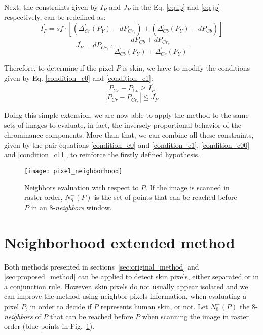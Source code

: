Next, the constraints given by $I_P$ and $J_P$ in the Eq. \ref{eq:ip} and \ref{eq:jp} respectively, can be redefined as:
\begin{equation}
    I^{'}_P = sf \cdot [(\Delta^{'}_{Cr}(P_Y) - dP_{Cr_s}) + (\Delta^{'}_{Cb}(P_Y) - dP_{Cb})]
\end{equation}
\begin{equation}
    J^{'}_P = dP_{Cr_s} \cdot \frac{dP_{Cb} + dP_{Cr_s}} {\Delta^{'}_{Cb}(P_Y) + \Delta^{'}_{Cr}(P_Y)}
\end{equation}

Therefore, to determine if the pixel $P$ is skin, we have to modify the conditions given by Eq. \ref{condition_c0} and \ref{condition_c1}:
\begin{equation}
    P_{Cr} - P_{Cb} \geq I^{'}_P
\label{condition_c00}
\end{equation}
\begin{equation}
   |P_{Cr} - P_{Cr_s}| \leq J^{'}_P
\label{condition_c11}
\end{equation}

Doing this simple extension, we are now able to apply the method to the same sets of images to evaluate, in fact, the inversely proportional behavior of the chrominance components. More than that, we can combine all these constraints, given by the pair equations \ref{condition_c0} and \ref{condition_c1}, \ref{condition_c00} and \ref{condition_c11}, to reinforce the firstly defined hypothesis.


\begin{figure}[H]
    \centering
    \texttt{[image: pixel\_neighborhood]}
    \caption[Neighbors evaluation with respect to a pixel $P$]{Neighbors evaluation with respect to $P$. If the image is scanned in raster order, $N_8^-(P)$ is the set of points that can be reached before $P$ in an 8-\textit{neighbors} window.}
    \label{fig:pixel_neighborhood}
\end{figure}


\section{Neighborhood extended method}
\label{sec:neighborhood_extended_method}
\noindent Both methods presented in sections~\ref{sec:original_method} and \ref{sec:proposed_method} can be applied to detect skin pixels, either separated or in a conjunction rule. However, skin pixels do not usually appear isolated and we can improve the method using neighbor pixels information, when evaluating a pixel $P$, in order to decide if $P$ represents human skin, or not. Let $N_8^-(P)$ the 8-\textit{neighbors} of $P$ that can be reached before $P$ when scanning the image in raster order (blue points in Fig.~\ref{fig:pixel_neighborhood}).

